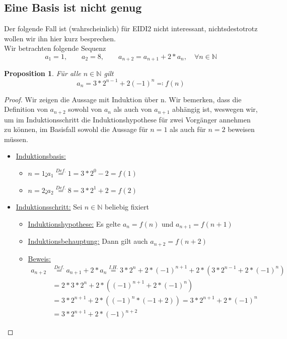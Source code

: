 \documentclass[hidelinks]{article}
\theoremstyle{plain}
\newtheorem{prop}[thm]{Proposition}
\theoremstyle{definition}
\theoremstyle{rem}
\begin{document}
\begin{sloppypar}
\subsection{Eine Basis ist nicht genug}
Der folgende Fall ist (wahrscheinlich) für EIDI2 nicht interessant, nichtsdestotrotz wollen wir ihn hier kurz besprechen.\\
Wir betrachten folgende Sequenz
\begin{equation}
a_1=1,\qquad a_2=8,\qquad a_{n+2}=a_{n+1}+2*a_n,\quad\forall n\in\mathbb{N}
\end{equation}
\begin{prop}
Für alle $n\in\mathbb{N}$ gilt
\begin{equation*}
	a_n=3*2^{n-1}+2(-1)^n\eqqcolon f(n)
\end{equation*}
\end{prop}
\begin{proof}
Wir zeigen die Aussage mit Induktion über n. Wir bemerken, dass die Definition von $a_{n+2}$ sowohl von $a_n$ als auch von $a_{n+1}$ abhängig ist, weswegen wir, um im Induktionsschritt die Induktionshypothese für zwei Vorgänger annehmen zu können, im Basisfall sowohl die Aussage für $n=1$ als auch für $n=2$ beweisen müssen.
\begin{itemize}
\item \underline{Induktionsbasis:} 
\begin{itemize}
\item \underline{$n=1$:}\qquad$a_1\stackrel{Def.}{=}1=3*2^0-2=f(1)$
\item \underline{$n=2$:}\qquad$a_2\stackrel{Def.}{=}8=3*2^1+2=f(2)$
\end{itemize}
\item \underline{Induktionsschritt:} Sei $n\in \mathbb{N}$ beliebig fixiert
	\begin{itemize}
	\item \underline{Induktionshypothese:} Es gelte $a_n=f(n)$ und $a_{n+1}=f(n+1)$
	\item \underline{Induktionsbehauptung:} Dann gilt auch $a_{n+2}=f(n+2)$
	\item \underline{Beweis:}
	\begin{align*}
		a_{n+2}&\stackrel{Def.}{=}a_{n+1}+2*a_n\stackrel{I.H.}{=}3*2^n+2*(-1)^{n+1}+2*(3*2^{n-1}+2*(-1)^n)\\
		&=2*3*2^n+2*((-1)^{n+1}+2*(-1)^n)\\
		&=3*2^{n+1}+2*((-1)^n*(-1+2))=3*2^{n+1}+2*(-1)^n\\
		&=3*2^{n+1}+2*(-1)^{n+2}
	\end{align*}
	\end{itemize}
\end{itemize}
\hfill
\end{proof}


\end{sloppypar}
\end{document}
